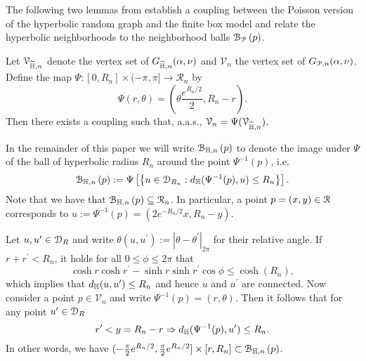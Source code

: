 The following two lemmas from \cite{fountoulakis2018law} establish a coupling between the Poisson version of the hyperbolic random graph and the finite box model and relate the hyperbolic neighborhoods to the neighborhood balls ${\mathcal B}_{{\mathcal P}}\left(p\right)$. 

\begin{lemma}\label{lem:coupling_hyperbolic_poisson}
Let $\mathcal{V}_{\widetilde{\mathbb{H}}, n}$ denote the vertex set of $G_{\widetilde{\mathbb{H}},n}(\alpha, \nu)$ and $\mathcal{V}_n$ the vertex set of $G_{{\mathcal P},n}(\alpha, \nu)$. Define the map $\Psi : [0,R_n] \times (-\pi, \pi] \to \mathcal{R}_n$ by
\begin{equation}\label{eq:def_Psi}
	\Psi(r,\theta) = \left(\theta \frac{e^{R_n/2}}{2}, R_n - r\right).
\end{equation}
Then there exists a coupling such that, a.a.s., $\mathcal{V}_n = \Psi(\mathcal{V}_{\widetilde{\mathbb{H}},n})$. %
\end{lemma}

In the remainder of this paper we will write ${\mathcal B}_{\mathbb{H},n}\left(p\right)$ to denote the image under $\Psi$ of the ball of hyperbolic radius $R_n$ around the point $\Psi^{-1}(p)$, i.e. 
\[
	{\mathcal B}_{\mathbb{H},n}\left(p\right) := 
	\Psi\left[ \left\{ u \in {\mathcal D}_{R_n} : 
	d_{\mathbb{H}}(\Psi^{-1}(p),u) \le R_n\right\}\right].
\]
Note that we have that ${\mathcal B}_{\mathbb{H},n}\left(p\right) \subseteq \mathcal{R}_n$. In particular, a point $p = (x,y) \in {\mathcal R}$ corresponds to $u := \Psi^{-1}(p) = (2 e^{-R_n/2} x, R_n - y)$. 

Let $u, u^\prime \in {\mathcal D}_R$ and write $\theta(u, u^\prime) := |\theta - \theta^\prime|_{2\pi}$ for their relative angle. If $r + r^\prime < R_n$, it holds for all $0 \le \phi \le 2\pi$ that
\[
	\cosh r \cosh r^\prime - \sinh r \sinh r^\prime \cos \phi \le \cosh(R_n),
\] 
which implies that $d_{\mathbb{H}}(u,u^\prime) \leq R_n$ and hence $u$ and $u^\prime$ are connected. Now consider a point $p \in \mathcal{V}_n$ and write $\Psi^{-1}(p) = (r,\theta)$. Then it follows that for any point $u^\prime \in {\mathcal D}_R$
\begin{equation}\label{eq:tail_inclusion_hyperbolic_ball}
	r^\prime < y = R_n - r \Rightarrow d_{\mathbb{H}} (\Psi^{-1}(p),u^\prime) \leq R_n.
\end{equation}
In other words, we have $(-\frac{\pi}{2}e^{R_n/2}, \frac{\pi}{2}e^{R_n/2}] \times [r, R_n]  \subset {\mathcal B}_{\mathbb{H},n}\left(p\right)$. 

